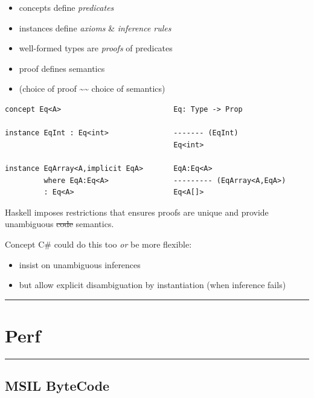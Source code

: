 \begin{itemize}
\tightlist
\item
  concepts define \emph{predicates}
\item
  instances define \emph{axioms} \& \emph{inference rules}
\item
  well-formed types are \emph{proofs} of predicates
\item
  proof defines semantics
\item
  (choice of proof \textasciitilde{}\textasciitilde{} choice of
  semantics)
\end{itemize}

\begin{lstlisting}
concept Eq<A>                          Eq: Type -> Prop

instance EqInt : Eq<int>               ------- (EqInt)
                                       Eq<int>
  
instance EqArray<A,implicit EqA>       EqA:Eq<A>
         where EqA:Eq<A>               --------- (EqArray<A,EqA>)
         : Eq<A>                       Eq<A[]>
\end{lstlisting}

Haskell imposes restrictions that ensures proofs are unique and provide
unambiguous \sout{code} semantics.

Concept C\# could do this too \emph{or} be more flexible:

\begin{itemize}
\tightlist
\item
  insist on unambiguous inferences
\item
  but allow explicit disambiguation by instantiation (when inference
  fails)
\end{itemize}

\begin{center}\rule{0.5\linewidth}{\linethickness}\end{center}

\section{Perf}\label{perf}

\begin{center}\rule{0.5\linewidth}{\linethickness}\end{center}

\subsection{MSIL ByteCode}\label{msil-bytecode}

